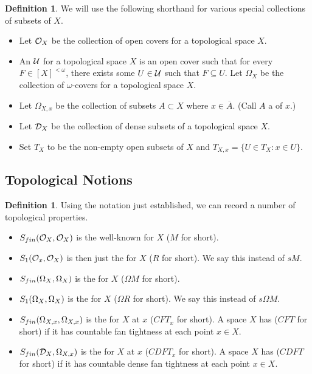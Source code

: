 \documentclass{amsart}
\theoremstyle{plain}
\theoremstyle{definition}
\newtheorem{definition}[theorem]{Definition}
\theoremstyle{remark}
\theoremstyle{plain}
\theoremstyle{definition}
\theoremstyle{remark}
\begin{document}
\begin{definition}
 We will use the following shorthand for various special collections of subsets of \(X\).
  \begin{itemize}
   \item Let \(\mathcal{O}_X\) be the collection of open covers for a topological space   \(X\).
   \item An  \(\mathcal{U}\)   for a topological space \(X\) is an open cover   such that for every \(F\in[X]^{<\omega}\), there exists some \(U\in\mathcal{U}\)   such that \(F\subseteq U\). Let \(\Omega_X\) be the collection of \(\omega\)-covers for a topological   space \(X\).
   \item Let \(\Omega_{X,x}\) be the collection of subsets \(A\subset X\) where   \(x\in \overline{A}\). (Call \(A\) a  of \(x\).)
   \item Let \(\mathcal{D}_{X}\) be the collection of dense subsets of a topological   space \(X\).
   \item Set \(T_X\) to be the non-empty open subsets of \(X\) and \(T_{X,x} = \{U \in T_X : x \in U\}\).
  \end{itemize}
\end{definition}

\subsection{Topological Notions}

\begin{definition}
 Using the notation just established, we can record a number of topological properties.
  \begin{itemize}
   \item \(S_{fin}(\mathcal{O}_X,\mathcal{O}_X)\) is the well-known  for \(X\) (\(M\) for short).
   \item \(S_{1}(\mathcal{O}_x,\mathcal{O}_X)\) is then just the  for \(X\) (\(R\) for short). We say this instead of \(sM\).
   \item \(S_{fin}(\Omega_X,\Omega_X)\) is the  for \(X\) (\(\Omega M\) for short).
   \item \(S_{1}(\Omega_X,\Omega_X)\) is the  for \(X\) (\(\Omega R\) for short). We say this instead of \(s\Omega M\).
   \item \(S_{fin}(\Omega_{X,x},\Omega_{X,x})\) is the  for \(X\) at \(x\) (\(CFT_x\) for short). A space \(X\) has  (\(CFT\) for short)
    if it has countable fan tightness at each point \(x\in X\).
   \item \(S_{fin}(\mathcal{D}_X,\Omega_{X,x})\) is the  for \(X\) at \(x\) (\(CDFT_x\) for short). A space \(X\) has  (\(CDFT\) for short) if it has countable dense fan tightness at each point \(x\in X\).
  \end{itemize}
\end{definition}
\end{document}
